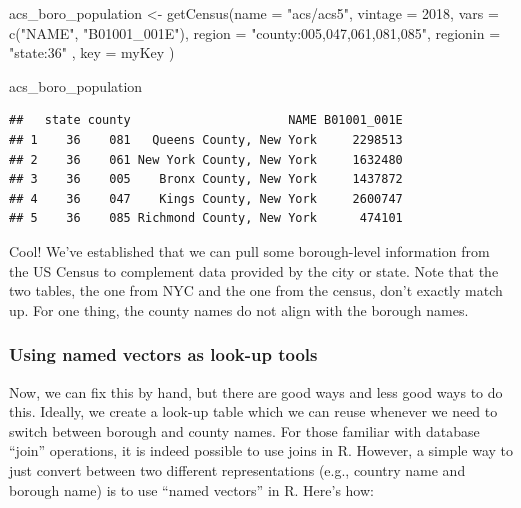 \documentclass[
  openany]{book}
\newenvironment{Shaded}{\begin{snugshade}}{\end{snugshade}}
\newcommand{\AttributeTok}[1]{\textcolor[rgb]{0.77,0.63,0.00}{#1}}
\newcommand{\DecValTok}[1]{\textcolor[rgb]{0.00,0.00,0.81}{#1}}
\newcommand{\FunctionTok}[1]{\textcolor[rgb]{0.00,0.00,0.00}{#1}}
\newcommand{\NormalTok}[1]{#1}
\newcommand{\OtherTok}[1]{\textcolor[rgb]{0.56,0.35,0.01}{#1}}
\newcommand{\StringTok}[1]{\textcolor[rgb]{0.31,0.60,0.02}{#1}}
\begin{document}
\begin{Shaded}
\begin{Highlighting}[]
\NormalTok{acs\_boro\_population }\OtherTok{\textless{}{-}} \FunctionTok{getCensus}\NormalTok{(}\AttributeTok{name =} \StringTok{"acs/acs5"}\NormalTok{,}
                         \AttributeTok{vintage =} \DecValTok{2018}\NormalTok{,}
                         \AttributeTok{vars =} \FunctionTok{c}\NormalTok{(}\StringTok{"NAME"}\NormalTok{, }\StringTok{"B01001\_001E"}\NormalTok{),}
                         \AttributeTok{region =} \StringTok{"county:005,047,061,081,085"}\NormalTok{,}
                         \AttributeTok{regionin =} \StringTok{"state:36"}\NormalTok{ , }\AttributeTok{key =}\NormalTok{ myKey}
\NormalTok{                         )}

\NormalTok{acs\_boro\_population}
\end{Highlighting}
\end{Shaded}

\begin{verbatim}
##   state county                      NAME B01001_001E
## 1    36    081   Queens County, New York     2298513
## 2    36    061 New York County, New York     1632480
## 3    36    005    Bronx County, New York     1437872
## 4    36    047    Kings County, New York     2600747
## 5    36    085 Richmond County, New York      474101
\end{verbatim}

Cool! We've established that we can pull some borough-level information from the US Census to complement data provided by the city or state. Note that the two tables, the one from NYC and the one from the census, don't exactly match up. For one thing, the county names do not align with the borough names.

\hypertarget{using-named-vectors-as-look-up-tools}{%
\subsubsection*{Using named vectors as look-up tools}\label{using-named-vectors-as-look-up-tools}}

Now, we can fix this by hand, but there are good ways and less good ways to do this. Ideally, we create a look-up table which we can reuse whenever we need to switch between borough and county names. For those familiar with database ``join'' operations, it is indeed possible to use joins in R. However, a simple way to just convert between two different representations (e.g., country name and borough name) is to use ``named vectors'' in R. Here's how:
\end{document}
